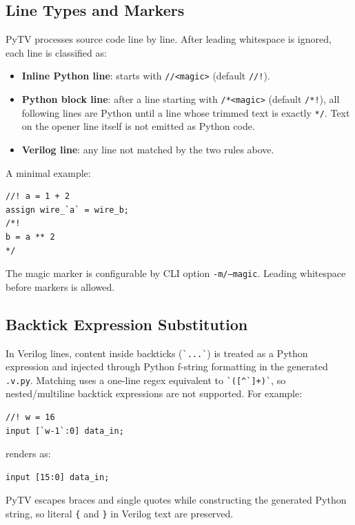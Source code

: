 \subsection{Line Types and Markers}
PyTV processes source code line by line.
After leading whitespace is ignored, each line is classified as:
\begin{itemize}
  \item \textbf{Inline Python line}: starts with \texttt{//<magic>} (default \texttt{//!}).
  \item \textbf{Python block line}: after a line starting with \texttt{/*<magic>} (default \texttt{/*!}),
  all following lines are Python until a line whose trimmed text is exactly \texttt{*/}.
  Text on the opener line itself is not emitted as Python code.
  \item \textbf{Verilog line}: any line not matched by the two rules above.
\end{itemize}

A minimal example:
\begin{verbatim}
//! a = 1 + 2
assign wire_`a` = wire_b;
/*!
b = a ** 2
*/
\end{verbatim}

The magic marker is configurable by CLI option \texttt{-m/--magic}.
Leading whitespace before markers is allowed.

\subsection{Backtick Expression Substitution}
In Verilog lines, content inside backticks (\verb|`...`|) is treated as a Python expression
and injected through Python f-string formatting in the generated \texttt{.v.py}.
Matching uses a one-line regex equivalent to \verb|`([^`]+)`|,
so nested/multiline backtick expressions are not supported.
For example:
\begin{verbatim}
//! w = 16
input [`w-1`:0] data_in;
\end{verbatim}
renders as:
\begin{verbatim}
input [15:0] data_in;
\end{verbatim}

PyTV escapes braces and single quotes while constructing the generated Python string,
so literal \verb|{| and \verb|}| in Verilog text are preserved.

